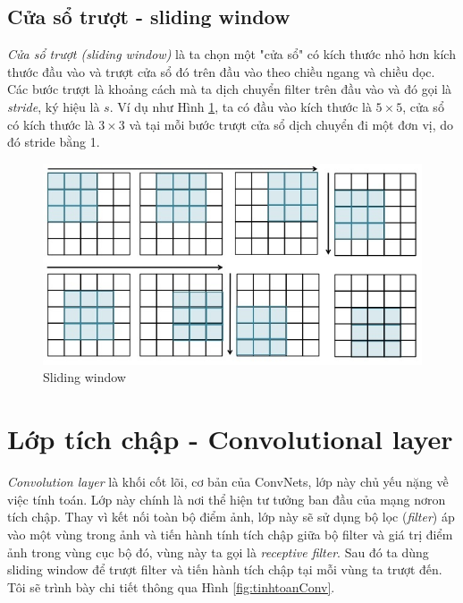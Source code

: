 \subsection{Cửa sổ trượt - sliding window}
\hspace{5mm} \textit{Cửa sổ trượt (sliding window)} là ta chọn một "cửa sổ" có kích thước nhỏ hơn kích thước đầu vào và trượt cửa sổ đó trên đầu vào theo chiều ngang và chiều dọc. Các bước trượt là khoảng cách mà ta dịch chuyển filter trên đầu vào và đó gọi là \textit{stride}, ký hiệu là $s$. Ví dụ như Hình \ref{fig:slidingwindow}, ta có đầu vào kích thước là $5\times5$, cửa sổ có kích thước là $3\times3$ và tại mỗi bước trượt cửa sổ dịch chuyển đi một đơn vị, do đó stride bằng 1.
\begin{center}
\begin{figure}[htp]
	\begin{center}
		\includegraphics[scale=1]{chap4/image/slidingwindow.jpg}
	\end{center}
	\caption{Sliding window}
	\label{fig:slidingwindow}
\end{figure}
\end{center}

\section{Lớp tích chập - Convolutional layer}
\hspace{5mm} \textit{Convolution layer} là khối cốt lõi, cơ bản của ConvNets, lớp này chủ yếu nặng về việc tính toán. Lớp này chính là nơi thể hiện tư tưởng ban đầu của mạng nơron tích chập. Thay vì kết nối toàn bộ điểm ảnh, lớp này sẽ sử dụng bộ lọc (\textit{filter}) áp vào một vùng trong ảnh và tiến hành tính tích chập giữa bộ filter và giá trị điểm ảnh trong vùng cục bộ đó,  vùng này ta gọi là \textit{receptive filter}. Sau đó ta dùng sliding window để trượt filter và tiến hành tích chập tại mỗi vùng ta trượt đến. Tôi sẽ trình bày chi tiết thông qua Hình  \ref{fig:tinhtoanConv}.

